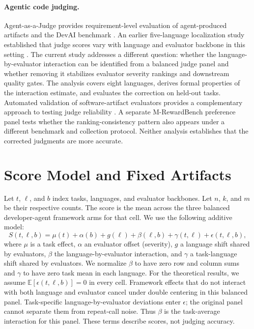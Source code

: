 \documentclass[sigconf,anonymous]{aamas}
\begin{document}
\paragraph{Agentic code judging.}
Agent-as-a-Judge provides requirement-level evaluation of agent-produced
artifacts and the DevAI benchmark \citep{zhuge2024agentjudge}. An earlier
five-language localization study established that judge scores vary with
language and evaluator backbone in this setting
\citep{mahmood2026multilingualpromptlocalizationagentasajudge}. The current
study addresses a different question: whether the language-by-evaluator
interaction can be identified from a balanced judge panel and whether
removing it stabilizes evaluator severity rankings and downstream quality
gates. The analysis covers eight languages, derives formal properties of
the interaction estimate, and evaluates the correction on held-out tasks.
Automated validation of software-artifact evaluators provides a complementary
approach to testing judge reliability \citep{fandina2025refine}. A separate
M-RewardBench preference panel \citep{gureja-etal-2025-rewardbench} tests
whether the ranking-consistency pattern also appears under a different
benchmark and collection protocol. Neither analysis establishes that the
corrected judgments are more accurate.

\section{Score Model and Fixed Artifacts}
\label{sec:attribution}

Let $t$, $\ell$, and $b$ index tasks, languages, and evaluator backbones.
Let $n$, $k$, and $m$ be their respective counts.
The score is the mean across the three balanced developer-agent framework
arms for that cell. We use the following additive model:
\begin{equation}
S(t,\ell,b) = \mu(t)+\alpha(b)+g(\ell)+\beta(\ell,b)
             +\gamma(t,\ell)+\epsilon(t,\ell,b),
\label{eq:model}
\end{equation}
where $\mu$ is a task effect, $\alpha$ an evaluator offset (severity), $g$ a
language shift shared by evaluators, $\beta$ the
language-by-evaluator interaction, and $\gamma$ a task-language shift
shared by evaluators. We normalize $\beta$ to have zero row and column
sums and $\gamma$ to have zero task mean in each language.
For the theoretical results, we assume
$\mathbb E[\epsilon(t,\ell,b)]=0$ in every cell. Framework effects that do not interact with both language and
evaluator cancel under double centering in this balanced panel. Task-specific
language-by-evaluator deviations enter $\epsilon$; the original panel
cannot separate them from repeat-call noise. Thus $\beta$ is the
task-average interaction for this panel.
These terms describe scores, not judging accuracy.
\end{document}
